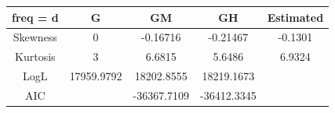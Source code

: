 \documentclass[16pt]{extarticle}
\begin{document}
\begin{figure}[H]
	\centering
	\hfill
	\hfill
	\caption{}
\end{figure}
\begin{center}
	\begin{tabular}{|c || c| c| c| c|} 
		\hline
		freq = d & G & GM & GH & Estimated \\ [0.5ex] 
		\hline\hline
		Skewness & 0 & -0.16716 & -0.21467 & -0.1301\\ 
		\hline
		Kurtosis & 3 & 6.6815 & 5.6486 & 6.9324\\
		\hline
		LogL & 17959.9792 & 18202.8555 & 18219.1673 \\
		\hline
		AIC &  & -36367.7109 & -36412.3345 \\[1ex] 
		\hline
	\end{tabular}
\end{center}
\end{document}
